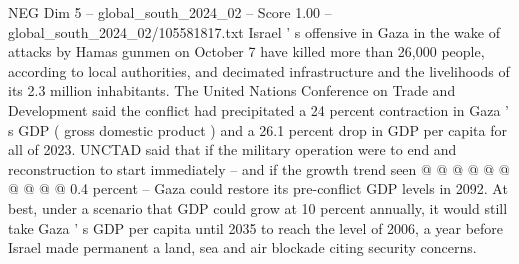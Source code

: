\begin{textsample}{NEG Dim 5 – global\_south\_2024\_02 – Score 1.00 – global\_south\_2024\_02/105581817.txt}
Israel ' s offensive in Gaza in the wake of attacks by Hamas gunmen on October 7 have killed more than 26,000 people, according to local authorities, and decimated infrastructure and the livelihoods of its 2.3 million inhabitants.
The United Nations Conference on Trade and Development said the conflict had precipitated a 24 percent contraction in Gaza ' s GDP ( gross domestic product ) and a 26.1 percent drop in GDP per capita for all of 2023.
UNCTAD said that if the military operation were to end and reconstruction to start immediately -- and if the growth trend seen @ @ @ @ @ @ @ @ @ @ 0.4 percent -- Gaza could restore its pre-conflict GDP levels in 2092.
At best, under a scenario that GDP could grow at 10 percent annually, it would still take Gaza ' s GDP per capita until 2035 to reach the level of 2006, a year before Israel made permanent a land, sea and air blockade citing security concerns.

\end{textsample}
